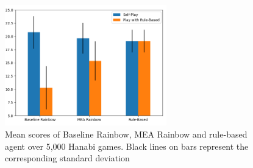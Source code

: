 \documentclass[letterpaper]{article} %
\begin{document}


  
    
    
    \begin{figure}[t]
    \centering
    \includegraphics[width=7.0cm]{bar plot.png}
    \caption{Mean scores of Baseline Rainbow, MEA Rainbow and rule-based agent over 5,000 Hanabi games. Black lines on bars represent the corresponding standard deviation}
    \label{fig:bar_plot}
\end{figure}

 
 
\end{document}
